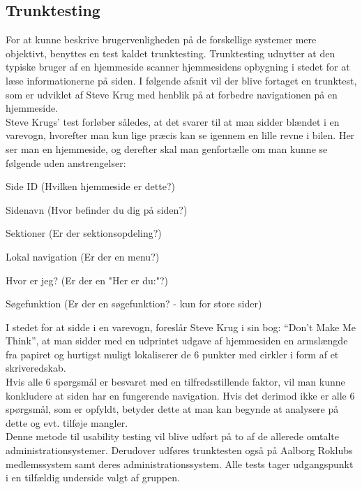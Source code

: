 \subsection{Trunktesting}
\label{sec:trunktesting}

For at kunne beskrive brugervenligheden på de forskellige systemer mere objektivt, benyttes en test kaldet trunktesting. Trunktesting udnytter at den typiske bruger af en hjemmeside scanner hjemmesidens opbygning i stedet for at læse informationerne på siden. I følgende afsnit vil der blive fortaget en trunktest, som er udviklet af Steve Krug med henblik på at forbedre navigationen på en hjemmeside.\\

Steve Krugs' test forløber således, at det svarer til at man sidder blændet i en varevogn, hvorefter man kun lige præcis kan se igennem en lille revne i bilen. Her ser man en hjemmeside, og derefter skal man genfortælle om man kunne se følgende uden anstrengelser:

\begin{enumerate_small}
	\item Side ID (Hvilken hjemmeside er dette?)
	\item Sidenavn (Hvor befinder du dig på siden?)
	\item Sektioner (Er der sektionsopdeling?)
	\item Lokal navigation (Er der en menu?)
	\item Hvor er jeg? (Er der en "Her er du:"\mbox{}?)
	\item Søgefunktion (Er der en søgefunktion? - kun for store sider)
\end{enumerate_small}

I stedet for at sidde i en varevogn, foreslår Steve Krug i sin bog: “Don't Make Me Think”, at man sidder med en udprintet udgave af hjemmesiden en armslængde fra papiret og hurtigst muligt lokaliserer de 6 punkter med cirkler i form af et skriveredskab.\\

Hvis alle 6 spørgsmål er besvaret med en tilfredsstillende faktor, vil man kunne konkludere at siden har en fungerende navigation. Hvis det derimod ikke er alle 6 spørgsmål, som er opfyldt, betyder dette at man kan begynde at analysere på dette og evt. tilføje mangler. \cite{John_Trunktesting}\\

Denne metode til usability testing vil blive udført på to af de allerede omtalte administrationsystemer. Derudover udføres trunktesten også på Aalborg Roklubs medlemssystem samt deres administrationssystem. Alle tests tager udgangspunkt i en tilfældig underside valgt af gruppen.

